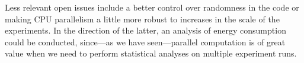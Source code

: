 	Less relevant open issues include a better control over randomness in the code or making CPU parallelism a little more robust to increases in the scale of the experiments. In the direction of the latter, an analysis of energy consumption could be conducted, since---as we have seen---parallel computation is of great value when we need to perform statistical analyses on multiple experiment runs.
